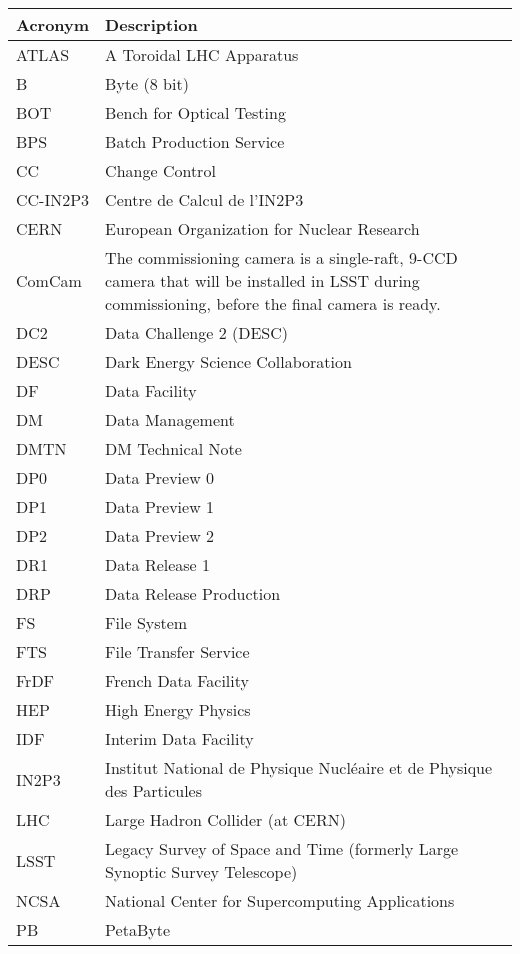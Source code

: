 \addtocounter{table}{-1}
\begin{longtable}{p{}p{}}\hline
\textbf{Acronym} & \textbf{Description}  \\\hline

ATLAS & A Toroidal LHC Apparatus \\\hline
B & Byte (8 bit) \\\hline
BOT & Bench for Optical Testing \\\hline
BPS & Batch Production Service \\\hline
CC & Change Control \\\hline
CC-IN2P3 & Centre de Calcul de l'IN2P3 \\\hline
CERN & European Organization for Nuclear Research \\\hline
ComCam & The commissioning camera is a single-raft, 9-CCD camera that will be installed in LSST during commissioning, before the final camera is ready. \\\hline
DC2 & Data Challenge 2 (DESC) \\\hline
DESC & Dark Energy Science Collaboration \\\hline
DF & Data Facility \\\hline
DM & Data Management \\\hline
DMTN & DM Technical Note \\\hline
DP0 & Data Preview 0 \\\hline
DP1 & Data Preview 1 \\\hline
DP2 & Data Preview 2 \\\hline
DR1 & Data Release 1 \\\hline
DRP & Data Release Production \\\hline
FS & File System \\\hline
FTS & File Transfer Service \\\hline
FrDF & French Data Facility \\\hline
HEP &  High Energy Physics \\\hline
IDF & Interim Data Facility \\\hline
IN2P3 & Institut National de Physique Nucléaire et de Physique des Particules \\\hline
LHC & Large Hadron Collider (at CERN) \\\hline
LSST & Legacy Survey of Space and Time (formerly Large Synoptic Survey Telescope) \\\hline
NCSA & National Center for Supercomputing Applications \\\hline
PB & PetaByte \\\hline

\end{longtable}
